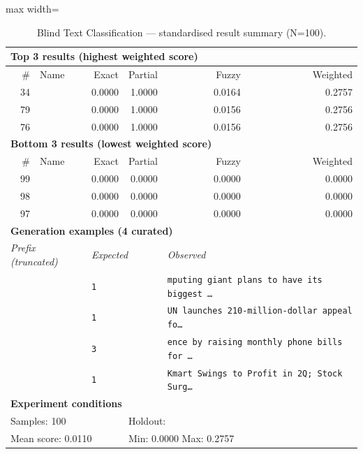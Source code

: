 \begin{table}[htbp]
\centering
\caption{Blind Text Classification — standardised result summary (N=100).}
\label{tab:blind_text_classification_summary}
\begin{adjustbox}{max width=\textwidth}
\begin{tabular}{r p{5cm} r r r r}
\toprule
\multicolumn{6}{l}{\textbf{Top 3 results (highest weighted score)}} \\
\midrule
\# & Name & Exact & Partial & Fuzzy & Weighted \\
\midrule
34 &  & 0.0000 & 1.0000 & 0.0164 & 0.2757 \\
79 &  & 0.0000 & 1.0000 & 0.0156 & 0.2756 \\
76 &  & 0.0000 & 1.0000 & 0.0156 & 0.2756 \\
\midrule
\multicolumn{6}{l}{\textbf{Bottom 3 results (lowest weighted score)}} \\
\midrule
\# & Name & Exact & Partial & Fuzzy & Weighted \\
\midrule
99 &  & 0.0000 & 0.0000 & 0.0000 & 0.0000 \\
98 &  & 0.0000 & 0.0000 & 0.0000 & 0.0000 \\
97 &  & 0.0000 & 0.0000 & 0.0000 & 0.0000 \\
\midrule
\multicolumn{6}{l}{\textbf{Generation examples (4 curated)}} \\
\midrule
\multicolumn{2}{l}{\textit{Prefix (truncated)}} & \multicolumn{2}{l}{\textit{Expected}} & \multicolumn{2}{l}{\textit{Observed}} \\
\midrule
\multicolumn{2}{l}{\texttt{}} & \multicolumn{2}{l}{\texttt{1}} & \multicolumn{2}{l}{\texttt{mputing giant plans to have its biggest \ldots}} \\
\multicolumn{2}{l}{\texttt{}} & \multicolumn{2}{l}{\texttt{1}} & \multicolumn{2}{l}{\texttt{UN launches 210-million-dollar appeal fo\ldots}} \\
\multicolumn{2}{l}{\texttt{}} & \multicolumn{2}{l}{\texttt{3}} & \multicolumn{2}{l}{\texttt{ence by raising monthly phone bills for \ldots}} \\
\multicolumn{2}{l}{\texttt{}} & \multicolumn{2}{l}{\texttt{1}} & \multicolumn{2}{l}{\texttt{Kmart Swings to Profit in 2Q; Stock Surg\ldots}} \\
\midrule
\multicolumn{6}{l}{\textbf{Experiment conditions}} \\
\midrule
\multicolumn{3}{l}{Samples: 100} & \multicolumn{3}{l}{Holdout: } \\
\multicolumn{3}{l}{Mean score: 0.0110} & \multicolumn{3}{l}{Min: 0.0000 \quad Max: 0.2757} \\

\end{tabular}
\end{adjustbox}
\end{table}

